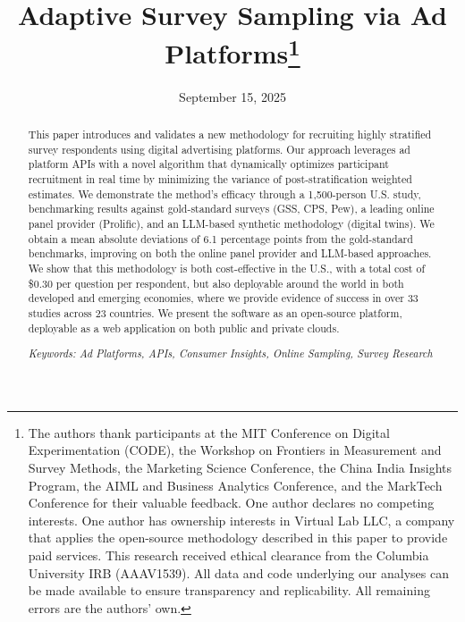 \documentclass[letterpaper,12pt]{article}
\title{{\Huge Adaptive Survey Sampling  via Ad Platforms}\thanks{The authors thank participants at the MIT Conference on Digital Experimentation (CODE), the Workshop on Frontiers in Measurement and Survey Methods, the Marketing Science Conference, the China India Insights Program, the AIML and Business Analytics Conference, and the MarkTech Conference for their valuable feedback. One author declares no competing interests. One author  has ownership interests in Virtual Lab LLC, a company that applies the open-source methodology described in this paper to provide paid services. This research received ethical clearance from the Columbia University IRB (AAAV1539). All data and code underlying our analyses can be made available to ensure transparency and replicability. All remaining errors are the authors’ own.\vspace{1pt}}}
\theoremstyle{proposition}
\begin{document}

\date{September 15, 2025}
\maketitle
\singlespacing
\begin{abstract}
This paper introduces and validates a new methodology for recruiting highly stratified survey respondents using digital advertising platforms. Our approach leverages ad platform APIs with a novel algorithm that dynamically optimizes participant recruitment in real time by minimizing the variance of post-stratification weighted estimates. We demonstrate the method’s efficacy through a 1,500-person U.S. study, benchmarking results against gold-standard surveys (GSS, CPS, Pew), a leading online panel provider (Prolific), and an LLM-based synthetic methodology (digital twins). We obtain a mean absolute deviations of 6.1 percentage points from the gold-standard benchmarks, improving on both the online panel provider and LLM-based approaches. We show that this methodology is both cost-effective in the U.S., with a total cost of \$0.30 per question per respondent, but also deployable around the world in both developed and emerging economies, where we provide evidence of success in over 33 studies across 23 countries. We present the software as an open-source platform, deployable as a web application on both public and private clouds.






\vspace{0.3cm}
\noindent \textit{Keywords: Ad Platforms, APIs, Consumer Insights,  Online Sampling, Survey Research}


\end{abstract}
\end{document}

